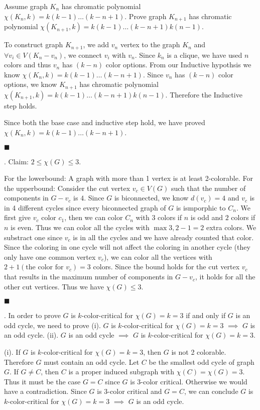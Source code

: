 \documentclass[12pt]{article}
\begin{document}
	Assume graph $K_n$ has chromatic polynomial $\chi(K_n, k) = k(k-1)\ldots(k-n+1)$. Prove graph $K_{n+1}$ has chromatic polynomial $\chi(K_{n+1}, k) = k(k-1)\ldots(k-n+1)k(n-1)$.
	
	To construct graph $K_{n+1}$, we add $v_n$ vertex to the graph $K_n$ and $\forall v_i \in V(K_n-v_n)$, we connect $v_i$ with $v_n$. Since $k_n$ is a clique, we have used $n$ colors and thus $v_n$ has $(k-n)$ color options. From our Inductive hypothsis we know $\chi(K_n, k) = k(k-1)\ldots(k-n+1)$. Since $v_n$ has $(k-n)$ color options, we know $K_{n+1}$ has chromatic polynomial $\chi(K_{n+1}, k) = k(k-1)\ldots(k-n+1)k(n-1)$. Therefore the Inductive step holds.
	
	Since both the base case and inductive step hold, we have proved $\chi(K_n, k) = k(k-1)\ldots(k-n+1)$.
	
		\hfill $\blacksquare$
		
	. Claim: $2 \leq \chi(G) \leq 3$.

	For the lowerbound: A graph with more than 1 vertex is at least 2-colorable. For the upperbound: Consider the cut vertex $v_c \in V(G)$ such that the number of components in $G-v_c$ is $4$. Since $G$ is biconnected, we know $d(v_c) = 4$ and $v_c$ is in 4 different cycles since every biconnected graph of $G$ is ismporphic to $C_n$. We first give $v_c$ color $c_1$, then we can color $C_n$ with $3$ colors if $n$ is odd and $2$ colors if $n$ is even. Thus we can color all the cycles with $\max{3,2}-1 = 2$ extra colors. We substract one since $v_c$ is in all the cycles and we have already counted that color. Since the coloring in one cycle will not affect the coloring in another cycle (they only have one common vertex $v_c$), we can color all the vertices with $2+1(\text{the color for }v_c)=3$ colors. Since the bound holds for the cut vertex $v_c$ that results in the maximum number of components in $G-v_c$, it holds for all the other cut vertices. Thus we have $\chi(G) \leq 3$.
	
	\hfill $\blacksquare$
	
	. In order to prove  $G$ is $k$-color-critical for $\chi(G) = k = 3$ if and only if $G$ is an odd cycle, we need to prove (i).  $G$ is $k$-color-critical for $\chi(G) = k = 3$ $\implies$ $G$ is an odd cycle. (ii). $G$ is an odd cycle $\implies$ $G$ is $k$-color-critical for $\chi(G) = k = 3$.
	
	(i). If $G$ is $k$-color-critical for $\chi(G) = k = 3$, then $G$ is not 2 colorable. Therefore $G$ must contain an odd cycle. Let $C$ be the smallest odd cycle of graph $G$. If $G \neq C$, then $C$ is a proper induced subgraph with $\chi(C) = \chi(G) = 3$. Thus it must be the case $G = C$ since $G$ is 3-color critical. Otherwise we would have a contradiction. Since $G$ is $3$-color critical and $G = C$, we can conclude $G$ is $k$-color-critical for $\chi(G) = k = 3$ $\implies$ $G$ is an odd cycle.
	
\end{document}
